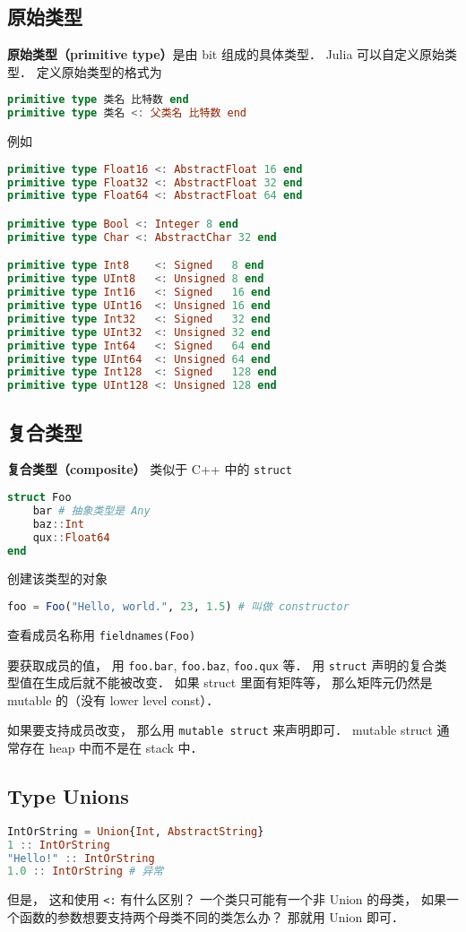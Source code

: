 \subsection{原始类型}
\textbf{原始类型（primitive type）}是由 bit 组成的具体类型． Julia 可以自定义原始类型． 定义原始类型的格式为
\begin{lstlisting}[language=julia]
primitive type 类名 比特数 end
primitive type 类名 <: 父类名 比特数 end
\end{lstlisting}
例如
\begin{lstlisting}[language=julia]
primitive type Float16 <: AbstractFloat 16 end
primitive type Float32 <: AbstractFloat 32 end
primitive type Float64 <: AbstractFloat 64 end

primitive type Bool <: Integer 8 end
primitive type Char <: AbstractChar 32 end

primitive type Int8    <: Signed   8 end
primitive type UInt8   <: Unsigned 8 end
primitive type Int16   <: Signed   16 end
primitive type UInt16  <: Unsigned 16 end
primitive type Int32   <: Signed   32 end
primitive type UInt32  <: Unsigned 32 end
primitive type Int64   <: Signed   64 end
primitive type UInt64  <: Unsigned 64 end
primitive type Int128  <: Signed   128 end
primitive type UInt128 <: Unsigned 128 end
\end{lstlisting}

\subsection{复合类型}
\textbf{复合类型（composite）} 类似于 C++ 中的 \verb|struct|
\begin{lstlisting}[language=julia]
struct Foo
    bar # 抽象类型是 Any
    baz::Int
    qux::Float64
end
\end{lstlisting}
创建该类型的对象
\begin{lstlisting}[language=julia]
foo = Foo("Hello, world.", 23, 1.5) # 叫做 constructor
\end{lstlisting}
查看成员名称用 \verb|fieldnames(Foo)|

要获取成员的值， 用 \verb|foo.bar|, \verb|foo.baz|, \verb|foo.qux| 等． 用 \verb|struct| 声明的复合类型值在生成后就不能被改变． 如果 struct 里面有矩阵等， 那么矩阵元仍然是 mutable 的（没有 lower level const）．

如果要支持成员改变， 那么用 \verb|mutable struct| 来声明即可． mutable struct 通常存在 heap 中而不是在 stack 中．

\subsection{Type Unions}
\begin{lstlisting}[language=julia]
IntOrString = Union{Int, AbstractString}
1 :: IntOrString
"Hello!" :: IntOrString
1.0 :: IntOrString # 异常
\end{lstlisting}
但是， 这和使用 \verb|<:| 有什么区别？ 一个类只可能有一个非 Union 的母类， 如果一个函数的参数想要支持两个母类不同的类怎么办？ 那就用 Union 即可．

